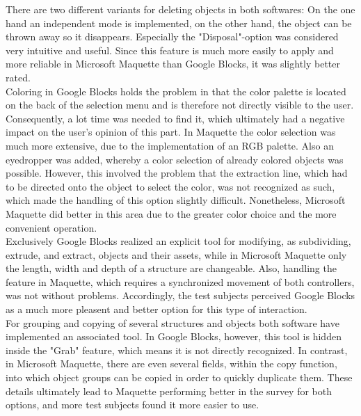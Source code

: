 \documentclass{report}
\begin{document}
			There are two different variants for deleting objects in both softwares: On the one hand an independent mode is implemented, on the other hand, the object can be thrown away so it disappears. Especially the "Disposal"-option was considered very intuitive and useful. Since this feature is much more easily to apply and more reliable in Microsoft Maquette than Google Blocks, it was slightly better rated. \\
			Coloring in Google Blocks holds the problem in that the color palette is located on the back of the selection menu and is therefore not directly visible to the user. Consequently, a lot time was needed to find it, which ultimately had a negative impact on the user's opinion of this part. In Maquette the color selection was much more extensive, due to the implementation of an RGB palette. Also an eyedropper was added, whereby a color selection of already colored objects was possible. However, this involved the problem that the extraction line, which had to be directed onto the object to select the color, was not recognized as such, which made the handling of this option slightly difficult. Nonetheless, Microsoft Maquette did better in this area due to the greater color choice and the more convenient operation. \\
			Exclusively Google Blocks realized an explicit tool for modifying, as subdividing, extrude, and extract, objects and their assets, while in Microsoft Maquette only the length, width and depth of a structure are changeable. Also, handling the feature in Maquette, which requires a synchronized movement of both controllers, was not without problems. Accordingly, the test subjects perceived Google Blocks as a much more pleasent and better option for this type of interaction. \\
			For grouping and copying of several structures and objects both software have implemented an associated tool. In Google Blocks, however, this tool is hidden inside the "Grab" feature, which means it is not directly recognized. In contrast, in Microsoft Maquette, there are even several fields, within the copy function, into which object groups can be copied in order to quickly duplicate them. These details ultimately lead to Maquette performing better in the survey for both options, and more test subjects found it more easier to use.
		\closesection
\end{document}
